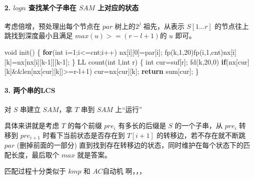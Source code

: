 \documentclass[
]{article}
\newenvironment{Shaded}{}{}
\newcommand{\ControlFlowTok}[1]{\textcolor[rgb]{0.00,0.44,0.13}{\textbf{#1}}}
\newcommand{\DataTypeTok}[1]{\textcolor[rgb]{0.56,0.13,0.00}{#1}}
\newcommand{\DecValTok}[1]{\textcolor[rgb]{0.25,0.63,0.44}{#1}}
\newcommand{\NormalTok}[1]{#1}
\begin{document}
\hypertarget{logn-ux67e5ux627eux67d0ux4e2aux5b50ux4e32ux5728-sam-ux4e0aux5bf9ux5e94ux7684ux72b6ux6001}{%
\paragraph{\texorpdfstring{2. \(logn\) 查找某个子串在 \(SAM\)
上对应的状态}{2. logn 查找某个子串在 SAM 上对应的状态}}\label{logn-ux67e5ux627eux67d0ux4e2aux5b50ux4e32ux5728-sam-ux4e0aux5bf9ux5e94ux7684ux72b6ux6001}}

考虑倍增，预处理出每个节点在 \(par\) 树上的\(2^j\) 祖先，从表示
\(S[1...r]\) 的节点往上跳找到深度最小且满足 \(max(u)>=(r-l+1)\)的 \(u\)
即可。

\begin{Shaded}
\begin{Highlighting}[]
\DataTypeTok{void}\NormalTok{ init()}
\NormalTok{\{}
    \ControlFlowTok{for}\NormalTok{(}\DataTypeTok{int}\NormalTok{ i=}\DecValTok{1}\NormalTok{;i\textless{}=cnt;i++) nx[i][}\DecValTok{0}\NormalTok{]=par[i];}
\NormalTok{    fp(k,}\DecValTok{1}\NormalTok{,}\DecValTok{20}\NormalTok{)fp(i,}\DecValTok{1}\NormalTok{,cnt)nx[i][k]=nx[nx[i][k{-}}\DecValTok{1}\NormalTok{]][k{-}}\DecValTok{1}\NormalTok{];}
\NormalTok{\}}
\NormalTok{LL count(}\DataTypeTok{int}\NormalTok{ l,}\DataTypeTok{int}\NormalTok{ r)}
\NormalTok{\{}
    \DataTypeTok{int}\NormalTok{ cur=suf[r];}
\NormalTok{    fd(k,}\DecValTok{20}\NormalTok{,}\DecValTok{0}\NormalTok{)}
        \ControlFlowTok{if}\NormalTok{(nx[cur][k]\&\&len[nx[cur][k]]\textgreater{}=r{-}l+}\DecValTok{1}\NormalTok{)}
\NormalTok{            cur=nx[cur][k];}
    \ControlFlowTok{return}\NormalTok{ sum[cur];}
\NormalTok{\}}
\end{Highlighting}
\end{Shaded}

\hypertarget{ux4e24ux4e2aux4e32ux7684lcs}{%
\paragraph{3. 两个串的LCS}\label{ux4e24ux4e2aux4e32ux7684lcs}}

对 \(S\) 串建立 \(SAM\)，拿 \(T\) 串到 \(SAM\) 上``运行''

具体来讲就是考虑 \(T\) 的每个前缀 \(pre_{i}\) 有多长的后缀是 \(S\)
的一个子串，从 \(pre_{i}\) 转移到 \(pre_{i+1}\) 时看下当前状态是否存在到
\(T[i+1]\) 的转移边，若不存在就不断跳 \(par\) (删掉前面的一部分)
直到找到存在转移边的状态，同时维护在每个状态下的匹配长度，最后取个
\(max\) 就是答案。

匹配过程十分类似于 \(kmp\) 和 \(AC\)自动机 啊，，，
\end{document}
